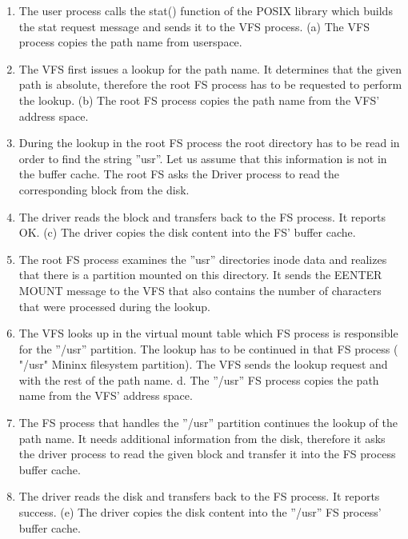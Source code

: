 \begin{enumerate}

\item The user process calls the stat() function of the POSIX library which builds the stat request message and sends it to the VFS process.
    (a) The VFS process copies the path name from userspace.

\item The VFS first issues a lookup for the path name. It determines that the given path is absolute, therefore the root FS process has to be requested to perform the lookup.
    (b) The root FS process copies the path name from the VFS’ address space.

\item During the lookup in the root FS process the root directory has to be read in order to find the string ”usr”. Let us assume that this information is not in the buffer cache. The root FS asks the Driver process to read the corresponding block from the disk.

\item The driver reads the block and transfers back to the FS process. It reports OK.
    (c) The driver copies the disk content into the FS’ buffer cache.

\item The root FS process examines the ”usr” directories inode data and realizes that there is a partition mounted on this directory. It sends the EENTER MOUNT message to the VFS that also contains the number of characters that were processed during the lookup.

\item The VFS looks up in the virtual mount table which FS process is responsible for the ”/usr” partition. The lookup has to be continued in that FS process ( "/usr" Mininx filesystem partition). The VFS sends the lookup request and with the rest of the path name.
    d. The ”/usr” FS process copies the path name from the VFS’ address space.

\item The FS process that handles the ”/usr” partition continues the lookup of the path name. It needs additional information from the disk, therefore it asks the driver process to read the given block and transfer it into the FS process buffer cache.

\item The driver reads the disk and transfers back to the FS process. It reports success.
    (e) The driver copies the disk content into the ”/usr” FS process’ buffer cache.


\end{enumerate}
